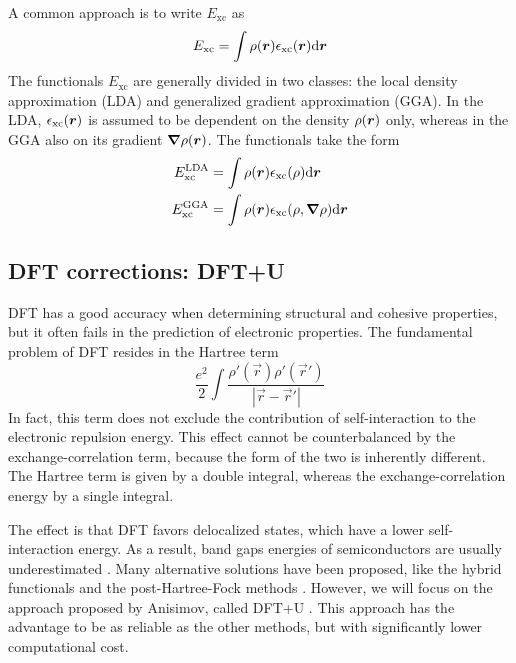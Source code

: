 A common approach is to write $E_\text{xc}$ as
\begin{equation}
    E_\text{xc} = \int \rr{\rho} \rr{\epsilon_\text{xc}} \dr
\end{equation}
The functionals $E_\text{xc}$ are generally divided in two classes: the local density approximation (LDA) and generalized gradient approximation (GGA). In the LDA, $\epsilon_\text{xc}(\mathbf{\boldsymbol{r}})$ is assumed to be dependent on the density $\rho(\mathbf{\boldsymbol{r}})$ only, whereas in the GGA also on its gradient $\grad \rho(\mathbf{\boldsymbol{r}})$. The functionals take the form
\begin{align}
    E_\text{xc}^\text{LDA} & = \int \rr{\rho} \epsilon_\text{xc}(\rho) \dr             \\
    E_\text{xc}^\text{GGA} & = \int \rr{\rho} \epsilon_\text{xc}(\rho, \grad \rho) \dr
\end{align}

\subsection{DFT corrections: DFT+U}
\label{sec:dft+u}
DFT has a good accuracy when determining structural and cohesive properties, but it often fails in the prediction of electronic properties. The fundamental problem of DFT resides in the Hartree term
\begin{equation}
    \frac{e^2}{2} \int \frac{\rho'(\vec{r})\rho'(\vec{r}')}{|\vec{r}-\vec{r}'|}
\end{equation}
In fact, this term does not exclude the contribution of self-interaction to the electronic repulsion energy. This effect cannot be counterbalanced by the exchange-correlation term, because the form of the two is inherently different. The Hartree term is given by a double integral, whereas the exchange-correlation energy by a single integral.

The effect is that DFT favors delocalized states, which have a lower self-interaction energy. As a result, band gaps energies of semiconductors are usually underestimated \cite{seidl1996}. Many alternative solutions have been proposed, like the hybrid functionals and the post-Hartree-Fock methods \cite{tolba2018}. However, we will focus on the approach proposed by Anisimov, called DFT+U \cite{anisimov1991}. This approach has the advantage to be as reliable as the other methods, but with significantly lower computational cost.

